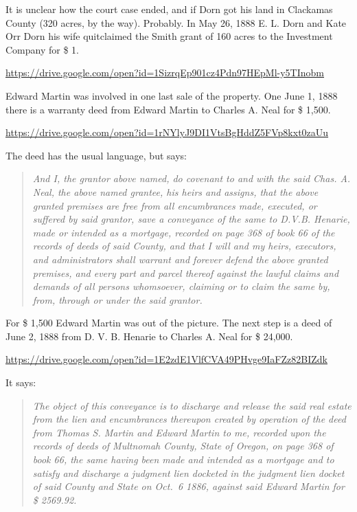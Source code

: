 \documentclass[
  12pt,
]{book}
\begin{document}
It is unclear how the court case ended, and if Dorn got his land in Clackamas County (320 acres, by the way). Probably. In May 26, 1888 E. L. Dorn and Kate Orr Dorn his wife quitclaimed the Smith grant of 160 acres to the Investment Company for \$ 1.

\url{https://drive.google.com/open?id=1SizrqEp901cz4Pdn97HEpMl-y5TInobm}

Edward Martin was involved in one last sale of the property. One June 1, 1888 there is a warranty deed from Edward Martin to Charles A. Neal for \$ 1,500.

\url{https://drive.google.com/open?id=1rNYlyJ9DI1VtsBgHddZ5FVp8kxt0zaUu}

The deed has the usual language, but says:

\begin{quote}
\emph{And I, the grantor above named, do covenant to and with the said Chas. A. Neal, the above named grantee, his heirs and assigns, that the above granted premises are free from all encumbrances made, executed, or suffered by said grantor, save a conveyance of the same to D.V.B. Henarie, made or intended as a mortgage, recorded on page 368 of book 66 of the records of deeds of said County, and that I will and my heirs, executors, and administrators shall warrant and forever defend the above granted premises, and every part and parcel thereof against the lawful claims and demands of all persons whomsoever, claiming or to claim the same by, from, through or under the said grantor.}
\end{quote}

For \$ 1,500 Edward Martin was out of the picture. The next step is a deed of June 2, 1888 from D. V. B. Henarie to Charles A. Neal for \$ 24,000.

\url{https://drive.google.com/open?id=1E2zdE1VlfCVA49PHvge9IaFZz82BIZdk}

It says:

\begin{quote}
\emph{The object of this conveyance is to discharge and release the said real estate from the lien and encumbrances thereupon created by operation of the deed from Thomas S. Martin and Edward Martin to me, recorded upon the records of deeds of Multnomah County, State of Oregon, on page 368 of book 66, the same having been made and intended as a mortgage and to satisfy and discharge a judgment lien docketed in the judgment lien docket of said County and State on Oct.~6 1886, against said Edward Martin for \$ 2569.92.}
\end{quote}
\end{document}
